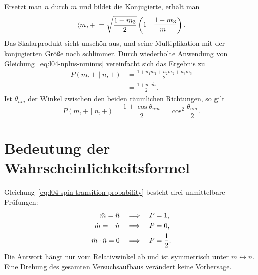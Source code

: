 Ersetzt man \(n\) durch \(m\) und bildet die Konjugierte, erhält man
\begin{equation}
  \left\langle m,+\right\rvert
  =
  \sqrt{\frac{1+m_3}{2}}
  \begin{pmatrix}
    1&
    \dfrac{1-m_3}{m_+}
  \end{pmatrix}.
\end{equation}
Das Skalarprodukt sieht unschön aus, und seine Multiplikation mit der konjugierten Größe noch schlimmer. Durch wiederholte Anwendung von Gleichung~\eqref{eq:l04-nplus-nminus} vereinfacht sich das Ergebnis zu
\begin{equation}
  \begin{aligned}
    P(m,+\mid n,+)
    &=\frac{1+n_1m_1+n_2m_2+n_3m_3}{2}\\
    &=\frac{1+\hat n\cdot\hat m}{2}.
  \end{aligned}
  \label{eq:l04-spin-transition-probability}
\end{equation}
Ist \(\theta_{nm}\) der Winkel zwischen den beiden räumlichen Richtungen, so gilt
\begin{equation}
  P(m,+\mid n,+)
  =
  \frac{1+\cos\theta_{nm}}{2}
  =
  \cos^2\frac{\theta_{nm}}{2}.
  \label{eq:l04-half-angle-probability}
\end{equation}

\begin{classroomqa}
\end{classroomqa}

\section{Bedeutung der Wahrscheinlichkeitsformel}

Gleichung~\eqref{eq:l04-spin-transition-probability} besteht drei unmittelbare Prüfungen:
\begin{align}
  \hat m=\hat n
  &\quad\Longrightarrow\quad P=1,
  \notag\\
  \hat m=-\hat n
  &\quad\Longrightarrow\quad P=0,
  \notag\\
  \hat m\cdot\hat n=0
  &\quad\Longrightarrow\quad P=\frac12.
\end{align}
Die Antwort hängt nur vom Relativwinkel ab und ist symmetrisch unter \(m\leftrightarrow n\). Eine Drehung des gesamten Versuchsaufbaus verändert keine Vorhersage.

